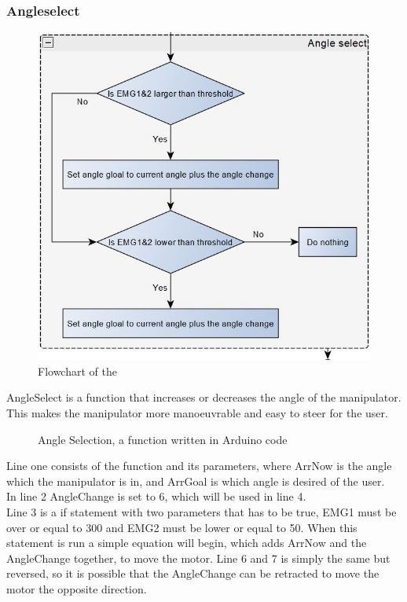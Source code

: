 \subsubsection{Angleselect}
\begin{figure}[H]
    \centering
    \includegraphics[width=\textwidth]{Figures/Technical_figures/Anlge_select_flow.JPG}
    \caption{Flowchart of the }
    \label{fig:my_label}
\end{figure}
AngleSelect is a function that increases or decreases the angle of the manipulator. This makes the manipulator more manoeuvrable and easy to steer for the user.\\
\begin{figure}[H]
    \centering
   


    \caption{Angle Selection, a function written in Arduino code}
    \label{fig:AngleSel}
\end{figure}
Line one consists of the function and its parameters, where ArrNow is the angle which the manipulator is in, and ArrGoal is which angle is desired of the user.\\
In line 2 AngleChange is set to 6, which will be used in line 4.\\
Line 3 is a if statement with two parameters that has to be true, EMG1 must be over or equal to 300 and EMG2 must be lower or equal to 50. When this statement is run a simple equation will begin, which adds ArrNow and the AngleChange together, to move the motor. Line 6 and 7 is simply the same but reversed, so it is possible that the AngleChange can be retracted to move the motor the opposite direction. 

